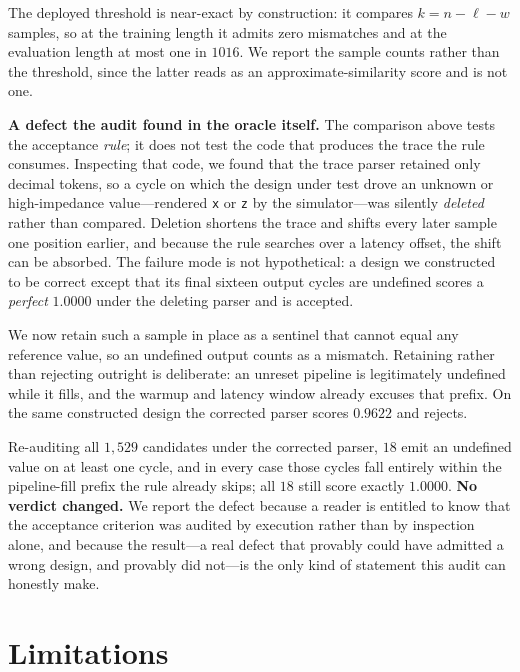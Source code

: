\documentclass[journal]{IEEEtran}
\begin{document}
The deployed threshold is near-exact by construction: it compares
$k = n - \ell - w$ samples, so at the training length it admits zero mismatches
and at the evaluation length at most one in $1016$. We report the sample counts
rather than the threshold, since the latter reads as an approximate-similarity
score and is not one.

\textbf{A defect the audit found in the oracle itself.} The comparison above
tests the acceptance \emph{rule}; it does not test the code that produces the
trace the rule consumes. Inspecting that code, we found that the trace parser
retained only decimal tokens, so a cycle on which the design under test drove an
unknown or high-impedance value---rendered \texttt{x} or \texttt{z} by the
simulator---was silently \emph{deleted} rather than compared. Deletion shortens
the trace and shifts every later sample one position earlier, and because the
rule searches over a latency offset, the shift can be absorbed. The failure mode
is not hypothetical: a design we constructed to be correct except that its final
sixteen output cycles are undefined scores a \emph{perfect} $1.0000$ under the
deleting parser and is accepted.

We now retain such a sample in place as a sentinel that cannot equal any
reference value, so an undefined output counts as a mismatch. Retaining rather
than rejecting outright is deliberate: an unreset pipeline is legitimately
undefined while it fills, and the warmup and latency window already excuses that
prefix. On the same constructed design the corrected parser scores $0.9622$ and
rejects.

Re-auditing all $1{,}529$ candidates under the corrected parser, $18$ emit an
undefined value on at least one cycle, and in every case those cycles fall
entirely within the pipeline-fill prefix the rule already skips; all $18$ still
score exactly $1.0000$. \textbf{No verdict changed.} We report the defect
because a reader is entitled to know that the acceptance criterion was audited
by execution rather than by inspection alone, and because the result---a real
defect that provably could have admitted a wrong design, and provably did
not---is the only kind of statement this audit can honestly make.

\section{Limitations}
\label{sec:limitations}
\end{document}
